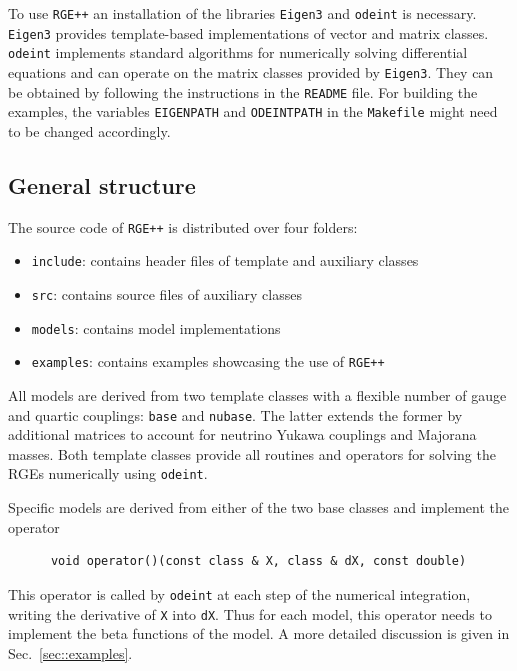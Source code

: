 \documentclass[preprint,12pt]{elsarticle}
\begin{document}
To use \texttt{RGE++} an installation of the libraries \texttt{Eigen3} \cite{eigenweb} and \texttt{odeint} \cite{Ahnert:2011} is necessary.
\texttt{Eigen3} provides template-based implementations of vector and matrix classes. \texttt{odeint} implements standard algorithms for numerically solving differential equations
and can operate on the matrix classes provided by \texttt{Eigen3}.
They can be obtained by following the instructions in the \texttt{README} file. For building the examples, the variables \texttt{EIGENPATH} and \texttt{ODEINTPATH} in the \texttt{Makefile} might need to be changed accordingly.

\subsection{\label{sec::operation} General structure}
The source code of \texttt{RGE++} is distributed over four folders:
\begin{itemize}
\item \texttt{include}: contains header files of template and auxiliary classes
\item \texttt{src}: contains source files of auxiliary classes
\item \texttt{models}: contains model implementations
\item \texttt{examples}: contains examples showcasing the use of \texttt{RGE++}
\end{itemize}
All models are derived from two template classes with a flexible number of gauge and quartic couplings: \texttt{base} and \texttt{nubase}. The latter extends the former by additional matrices to account for neutrino Yukawa couplings
and Majorana masses. Both template classes provide all routines and operators for solving the RGEs numerically using \texttt{odeint}.

Specific models are derived from either of the two base classes and implement the operator
\begin{lstlisting}
      void operator()(const class & X, class & dX, const double)
\end{lstlisting}
This operator is called by \texttt{odeint} at each step of the numerical integration, writing the derivative of \texttt{X} into \texttt{dX}.
Thus for each model, this operator needs to implement the beta functions of the model. A more detailed discussion is given in Sec.~\ref{sec::examples}.
\end{document}
